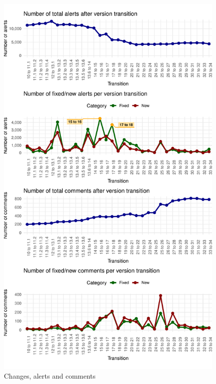\documentclass[
]{article}
\begin{document}
\small

\normalsize

\small

\begin{figure}
\centering
\includegraphics{report_files/figure-latex/unnamed-chunk-21-1.pdf}
\caption{\label{timeseries}Changes, alerts and comments}
\end{figure}

\normalsize

\newpage
\end{document}
